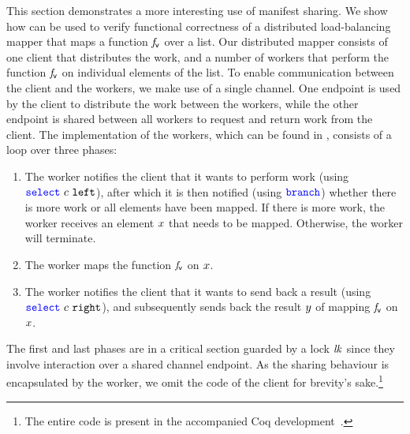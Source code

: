 This section demonstrates a more interesting use of manifest sharing.
We show how \lname can be used to verify functional correctness
of a distributed load-balancing mapper that maps a function $\mathit{f}_{\mathsf v}$ over a list.
Our distributed mapper consists of one client that distributes the work, and a
number of workers that perform the function $\mathit{f}_{\mathsf v}$ on individual elements of
the list.
To enable communication between the client and the workers, we make use of
a single channel.
One endpoint is used by the client to distribute the work between the workers,
while the other endpoint is shared between all workers to request and
return work from the client.
The implementation of the workers, which can be found in
, consists of a loop over three phases:
\begin{enumerate}
\item The worker notifies the client that it wants to perform work (using
  $\texttt{\color{blue} select}\ c\ \mathtt{left}$), after which it is then notified (using
  $\texttt{\color{blue} branch}$) whether there is more work or all elements have been mapped.
  If there is more work, the worker receives an element $x$ that needs to
  be mapped.
  Otherwise, the worker will terminate.
\item The worker maps the function $\mathit{f}_{\mathsf v}$ on $x$.
\item The worker notifies the client that it wants to send back a result
  (using $\texttt{\color{blue} select}\ c\ \mathtt{right}$), and subsequently sends back the
  result $y$ of mapping $\mathit{f}_{\mathsf v}$ on $x$.
\end{enumerate}
The first and last phases are in a critical section guarded by a lock $\mathit{lk}$
since they involve interaction over a shared channel endpoint.
As the sharing behaviour is encapsulated by the worker, we omit the code of the client
for brevity's sake.\footnote{The entire code is present in
the accompanied Coq development~\cite{actris_coq}.}
\parmapperworkerfig
\authMfig

